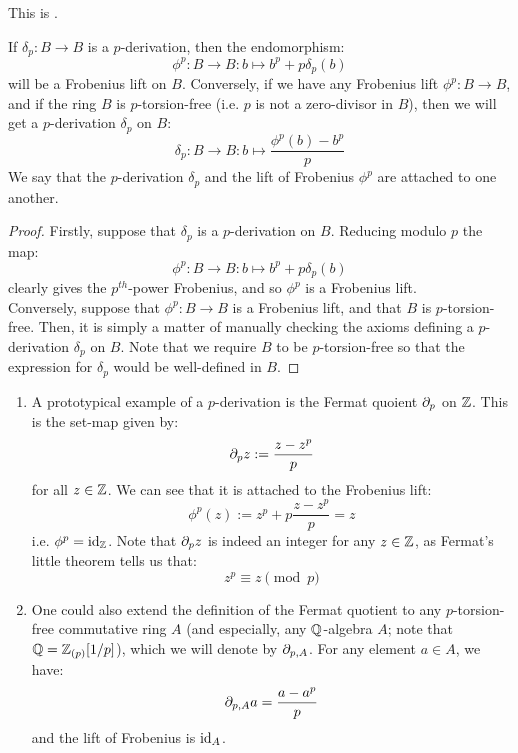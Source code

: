         \begin{proposition} \label{prop: p_derivations_and_frobenius_lifts}
            This is \cite[Remark 2.2]{bhatt_scholze_prisms}.
            
            If $\delta_p: B \to B$ is a $p$-derivation, then the endomorphism:
                $$\phi^p: B \to B: b \mapsto b^p + p\delta_p(b)$$
            will be a Frobenius lift on $B$. Conversely, if we have any Frobenius lift $\phi^p: B \to B$, and if the ring $B$ is $p$-torsion-free (i.e. $p$ is not a zero-divisor in $B$), then we will get a $p$-derivation $\delta_p$ on $B$:
                $$\delta_p: B \to B: b \mapsto \frac{\phi^p(b) - b^p}{p}$$
            We say that the $p$-derivation $\delta_p$ and the lift of Frobenius $\phi^p$ are attached to one another.
        \end{proposition}
            \begin{proof}
                Firstly, suppose that $\delta_p$ is a $p$-derivation on $B$. Reducing modulo $p$ the map:
                    $$\phi^p: B \to B: b \mapsto b^p + p\delta_p(b)$$
                clearly gives the $p^{th}$-power Frobenius, and so $\phi^p$ is a Frobenius lift. 
                \\
                Conversely, suppose that $\phi^p: B \to B$ is a Frobenius lift, and that $B$ is $p$-torsion-free. Then, it is simply a matter of manually checking the axioms defining a $p$-derivation $\delta_p$ on $B$. Note that we require $B$ to be $p$-torsion-free so that the expression for $\delta_p$ would be well-defined in $B$.
            \end{proof}
        \begin{example} \label{example: p_derivations}
            \noindent
            \begin{enumerate}
                \item A prototypical example of a $p$-derivation is the Fermat quoient $\partial_p$ on $\mathbb{Z}$. This is the set-map given by:
                    $$\partial_p z := \frac{z - z^p}{p}$$
                for all $z \in \mathbb{Z}$. We can see that it is attached to the Frobenius lift:
                    $$\phi^p(z) := z^p + p \frac{z - z^p}{p} = z$$
                i.e. $\phi^p = \mathrm{id}_{\mathbb{Z}}$. Note that $\partial_p z$ is indeed an integer for any $z \in \mathbb{Z}$, as Fermat's little theorem tells us that:
                    $$z^p \equiv z \pmod{p}$$
                \item One could also extend the definition of the Fermat quotient to any $p$-torsion-free commutative ring $A$ (and especially, any $\mathbb{Q}$-algebra $A$; note that $\mathbb{Q} = \mathbb{Z}_{(p)}[1/p]$), which we will denote by $\partial_{p,A}$. For any element $a \in A$, we have:
                    $$\partial_{p,A}a = \frac{a - a^p}{p}$$
                and the lift of Frobenius is $\mathrm{id}_A$.
            \end{enumerate}
        \end{example}
            

